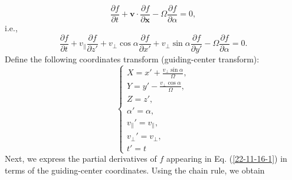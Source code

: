 \documentclass{llncs}
\begin{document}
\begin{equation}
  \frac{\partial f}{\partial t} +\mathbf{v} \cdot \frac{\partial f}{\partial
  \mathbf{x}} - \Omega \frac{\partial f}{\partial \alpha} = 0,
\end{equation}
i.e.,
\begin{equation}
  \label{22-11-16-1} \frac{\partial f}{\partial t} + v_{\parallel}
  \frac{\partial f}{\partial z'} + v_{\perp} \cos \alpha \frac{\partial
  f}{\partial x'} + v_{\perp} \sin \alpha \frac{\partial f}{\partial y'} -
  \Omega \frac{\partial f}{\partial \alpha} = 0.
\end{equation}
Define the following coordinates transform (guiding-center transform):
\begin{equation}
  \left\{ \begin{array}{l}
    X = x' + \frac{v_{\perp} \sin \alpha}{\Omega},\\
    Y = y' - \frac{v_{\perp} \cos \alpha}{\Omega},\\
    Z = z',\\
    \alpha' = \alpha,\\
    v_{\parallel}' = v_{\parallel},\\
    v_{\perp}' = v_{\perp},\\
    t' = t
  \end{array} \right.
\end{equation}
Next, we express the partial derivatives of $f$ appearing in Eq.
(\ref{22-11-16-1}) in terms of the guiding-center coordinates. Using the chain
rule, we obtain
\end{document}
